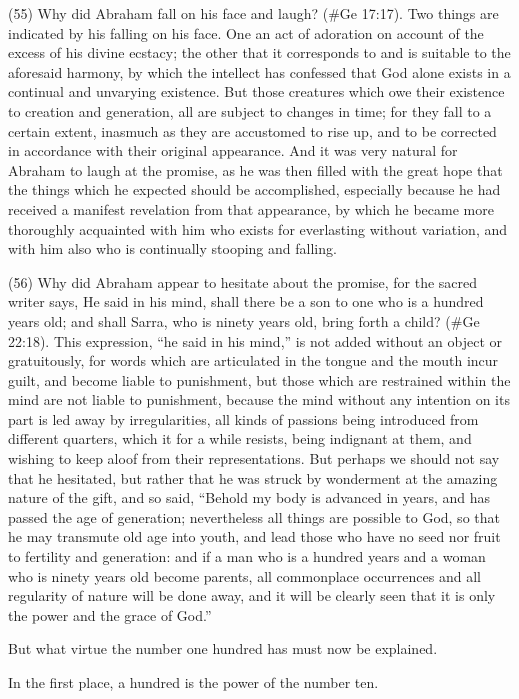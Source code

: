 (55) Why did Abraham fall on his face and laugh? (\#Ge 17:17). Two things are indicated by his
falling on his face. One an act of adoration on account of the excess of his divine ecstacy; the
other that it corresponds to and is suitable to the aforesaid harmony, by which the intellect has
confessed that God alone exists in a continual and unvarying existence. But those creatures which
owe their existence to creation and generation, all are subject to changes in time; for they fall to a
certain extent, inasmuch as they are accustomed to rise up, and to be corrected in accordance
with their original appearance. And it was very natural for Abraham to laugh at the promise, as he
was then filled with the great hope that the things which he expected should be accomplished,
especially because he had received a manifest revelation from that appearance, by which he
became more thoroughly acquainted with him who exists for everlasting without variation, and with
him also who is continually stooping and falling.

(56) Why did Abraham appear to hesitate about the promise, for the sacred writer says, He said in
his mind, shall there be a son to one who is a hundred years old; and shall Sarra, who is ninety
years old, bring forth a child? (\#Ge 22:18). This expression, ``he said in his mind,'' is not added
without an object or gratuitously, for words which are articulated in the tongue and the mouth incur
guilt, and become liable to punishment, but those which are restrained within the mind are not liable
to punishment, because the mind without any intention on its part is led away by irregularities, all
kinds of passions being introduced from different quarters, which it for a while resists, being
indignant at them, and wishing to keep aloof from their representations. But perhaps we should not
say that he hesitated, but rather that he was struck by wonderment at the amazing nature of the
gift, and so said, ``Behold my body is advanced in years, and has passed the age of generation;
nevertheless all things are possible to God, so that he may transmute old age into youth, and lead
those who have no seed nor fruit to fertility and generation: and if a man who is a hundred years
and a woman who is ninety years old become parents, all commonplace occurrences and all
regularity of nature will be done away, and it will be clearly seen that it is only the power and the
grace of God.''

But what virtue the number one hundred has must now be explained.

In the first place, a hundred is the power of the number ten.

